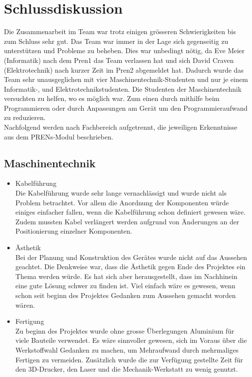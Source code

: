 \documentclass[a4paper]{report}
\begin{document}
\chapter{Schlussdiskussion}
\label{ch:SchlussDisku}
Die Zusammenarbeit im Team war trotz einigen grösseren Schwierigkeiten bis zum Schluss sehr gut. Das Team war immer in der Lage sich gegenseitig zu unterstützen und Probleme zu beheben. Dies war unbedingt nötig, da Eve Meier (Informatik) nach dem Pren1 das Team verlassen hat und sich David Craven (Elektrotechnik) nach kurzer Zeit im Pren2 abgemeldet hat. Dadurch wurde das Team sehr unausgeglichen mit vier Maschinentechnik-Studenten und nur je einem Informatik-, und Elektrotechnikstudenten. Die Studenten der Maschinentechnik versuchten zu helfen, wo es möglich war. Zum einen durch mithilfe beim Programmieren oder durch Anpassungen am Gerät um den Programmieraufwand zu reduzieren.\\
Nachfolgend werden nach Fachbereich aufgetrennt, die jeweiligen Erkenntnisse aus dem PRENs-Modul beschrieben.

\section{Maschinentechnik}

\begin{itemize}
	\item Kabelführung\\
	Die Kabelführung wurde sehr lange vernachlässigt und wurde nicht als Problem betrachtet. Vor allem die Anordnung der Komponenten würde einiges einfacher fallen, wenn die Kabelführung schon definiert gewesen wäre. Zudem mussten Kabel verlängert werden aufgrund von Änderungen an der Positionierung einzelner Komponenten.
	\item Ästhetik\\
	Bei der Planung und Konstruktion des Gerätes wurde nicht auf das Aussehen geachtet. Die Denkweise war, dass die Ästhetik gegen Ende des Projektes ein Thema werden würde. Es hat sich aber herausgestellt, dass im Nachhinein eine gute Lösung schwer zu finden ist. Viel einfach wäre es gewesen, wenn schon seit beginn des Projektes Gedanken zum Aussehen gemacht worden wären.
	\item Fertigung\\
	Zu beginn des Projektes wurde ohne grosse Überlegungen Aluminium für viele Bauteile verwendet. Es wäre sinnvoller gewesen, sich im Voraus über die Werkstoffwahl Gedanken zu machen, um Mehraufwand durch mehrmaliges Fertigen zu vermeiden. Zusätzlich wurde die zur Verfügung gestellte Zeit für den 3D-Drucker, den Laser und die Mechanik-Werkstatt zu wenig genutzt.
\end{itemize}
\end{document}
